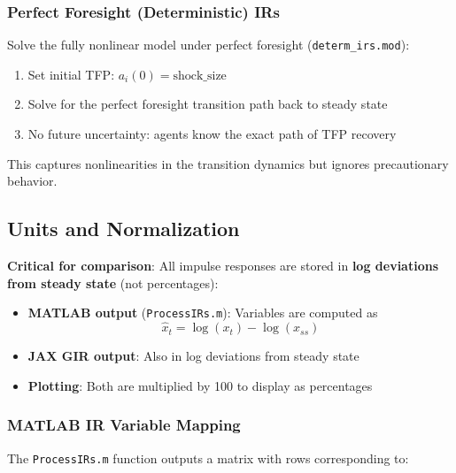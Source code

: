 \documentclass[11pt]{article}
\begin{document}
\subsubsection{Perfect Foresight (Deterministic) IRs}

Solve the fully nonlinear model under perfect foresight (\texttt{determ\_irs.mod}):
\begin{enumerate}
    \item Set initial TFP: $a_i(0) = \text{shock\_size}$
    \item Solve for the perfect foresight transition path back to steady state
    \item No future uncertainty: agents know the exact path of TFP recovery
\end{enumerate}

This captures nonlinearities in the transition dynamics but ignores precautionary behavior.

\subsection{Units and Normalization}

\textbf{Critical for comparison}: All impulse responses are stored in \textbf{log deviations from steady state} (not percentages):

\begin{itemize}
    \item \textbf{MATLAB output} (\texttt{ProcessIRs.m}): Variables are computed as
    \begin{equation}
        \hat{x}_t = \log(x_t) - \log(x_{ss})
    \end{equation}
    
    \item \textbf{JAX GIR output}: Also in log deviations from steady state
    
    \item \textbf{Plotting}: Both are multiplied by 100 to display as percentages
\end{itemize}

\subsubsection{MATLAB IR Variable Mapping}

The \texttt{ProcessIRs.m} function outputs a matrix with rows corresponding to:
\end{document}
